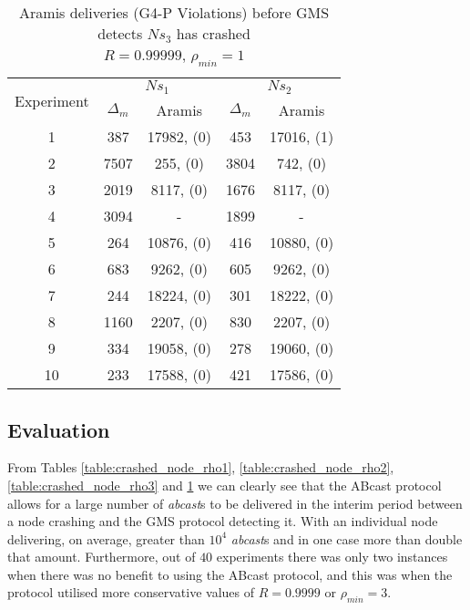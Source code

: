 \begin{table}[p]
    \begin{center}
        \renewcommand{\arraystretch}{1.25}
        \begin{tabular}{|c|c|c|c|c|}
            \hline
            \multirow{2}{*}{Experiment} & \multicolumn{2}{|c|}{$Ns_1$} & \multicolumn{2}{|c|}{$Ns_2$} \\ \cline{2-5}
                                                       & $\Delta_m$&\textsf{Aramis} & $\Delta_m$&\textsf{Aramis} \\ \hline \hline
            1 & 387 & 17982, (0) & 453 & 17016, (1)  \\ \hline
            2 & 7507 & 255, (0) & 3804 & 742, (0)  \\ \hline
            3 & 2019 & 8117, (0) & 1676 & 8117, (0)  \\ \hline
            4 & 3094 & - & 1899 & -  \\ \hline
            5 & 264 & 10876, (0) & 416 & 10880, (0)  \\ \hline
            6 & 683 & 9262, (0) & 605 & 9262, (0)  \\ \hline
            7 & 244 & 18224, (0) & 301 & 18222, (0)  \\ \hline
            8 & 1160 & 2207, (0) & 830 & 2207, (0)  \\ \hline
            9 & 334 & 19058, (0) & 278 & 19060, (0)  \\ \hline
            10 & 233 & 17588, (0) & 421 & 17586, (0)  \\ \hline
        \end{tabular}
        \caption[\textsf{Aramis} deliveries before GMS detects node crash ($R=0.99999$, $\rho_{min}=1$)]{\textsf{Aramis} deliveries (G4-P Violations) before GMS detects $Ns_3$ has crashed \\ $R=0.99999$, $\rho_{min}=1$}
        \label{table:crashed_node_R.99999}
    \end{center}
\end{table}

    \subsection{Evaluation}
    From Tables \ref{table:crashed_node_rho1}, \ref{table:crashed_node_rho2},  \ref{table:crashed_node_rho3} and \ref{table:crashed_node_R.99999} we can clearly see that the \textsf{ABcast} protocol allows for a large number of \emph{abcast}s to be delivered in the interim period between a node crashing and the GMS protocol detecting it.  With an individual node delivering, on average, greater than $10^4$ \emph{abcast}s and in one case more than double that amount.  Furthermore, out of $40$ experiments there was only two instances when there was no benefit to using the \textsf{ABcast} protocol, and this was when the protocol utilised more conservative values of $R=0.9999$ or $\rho_{min}=3$.  
    
